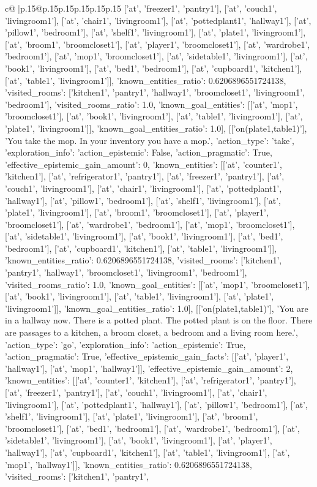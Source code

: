 \documentclass{article}
\begin{document}
{\begin{supertabular}{c@{$\;$}|p{.15\linewidth}@{}p{.15\linewidth}p{.15\linewidth}p{.15\linewidth}p{.15\linewidth}p{.15\linewidth}}
{{{['at', 'freezer1', 'pantry1'], ['at', 'couch1', 'livingroom1'], ['at', 'chair1', 'livingroom1'], ['at', 'pottedplant1', 'hallway1'], ['at', 'pillow1', 'bedroom1'], ['at', 'shelf1', 'livingroom1'], ['at', 'plate1', 'livingroom1'], ['at', 'broom1', 'broomcloset1'], ['at', 'player1', 'broomcloset1'], ['at', 'wardrobe1', 'bedroom1'], ['at', 'mop1', 'broomcloset1'], ['at', 'sidetable1', 'livingroom1'], ['at', 'book1', 'livingroom1'], ['at', 'bed1', 'bedroom1'], ['at', 'cupboard1', 'kitchen1'], ['at', 'table1', 'livingroom1']], 'known_entities_ratio': 0.6206896551724138, 'visited_rooms': ['kitchen1', 'pantry1', 'hallway1', 'broomcloset1', 'livingroom1', 'bedroom1'], 'visited_rooms_ratio': 1.0, 'known_goal_entities': [['at', 'mop1', 'broomcloset1'], ['at', 'book1', 'livingroom1'], ['at', 'table1', 'livingroom1'], ['at', 'plate1', 'livingroom1']], 'known_goal_entities_ratio': 1.0}}], [['on(plate1,table1)'], 'You take the mop. In your inventory you have a mop.', {'action_type': 'take', 'exploration_info': {'action_epistemic': False, 'action_pragmatic': True, 'effective_epistemic_gain_amount': 0, 'known_entities': [['at', 'counter1', 'kitchen1'], ['at', 'refrigerator1', 'pantry1'], ['at', 'freezer1', 'pantry1'], ['at', 'couch1', 'livingroom1'], ['at', 'chair1', 'livingroom1'], ['at', 'pottedplant1', 'hallway1'], ['at', 'pillow1', 'bedroom1'], ['at', 'shelf1', 'livingroom1'], ['at', 'plate1', 'livingroom1'], ['at', 'broom1', 'broomcloset1'], ['at', 'player1', 'broomcloset1'], ['at', 'wardrobe1', 'bedroom1'], ['at', 'mop1', 'broomcloset1'], ['at', 'sidetable1', 'livingroom1'], ['at', 'book1', 'livingroom1'], ['at', 'bed1', 'bedroom1'], ['at', 'cupboard1', 'kitchen1'], ['at', 'table1', 'livingroom1']], 'known_entities_ratio': 0.6206896551724138, 'visited_rooms': ['kitchen1', 'pantry1', 'hallway1', 'broomcloset1', 'livingroom1', 'bedroom1'], 'visited_rooms_ratio': 1.0, 'known_goal_entities': [['at', 'mop1', 'broomcloset1'], ['at', 'book1', 'livingroom1'], ['at', 'table1', 'livingroom1'], ['at', 'plate1', 'livingroom1']], 'known_goal_entities_ratio': 1.0}}], [['on(plate1,table1)'], 'You are in a hallway now. There is a potted plant. The potted plant is on the floor. There are passages to a kitchen, a broom closet, a bedroom and a living room here.', {'action_type': 'go', 'exploration_info': {'action_epistemic': True, 'action_pragmatic': True, 'effective_epistemic_gain_facts': [['at', 'player1', 'hallway1'], ['at', 'mop1', 'hallway1']], 'effective_epistemic_gain_amount': 2, 'known_entities': [['at', 'counter1', 'kitchen1'], ['at', 'refrigerator1', 'pantry1'], ['at', 'freezer1', 'pantry1'], ['at', 'couch1', 'livingroom1'], ['at', 'chair1', 'livingroom1'], ['at', 'pottedplant1', 'hallway1'], ['at', 'pillow1', 'bedroom1'], ['at', 'shelf1', 'livingroom1'], ['at', 'plate1', 'livingroom1'], ['at', 'broom1', 'broomcloset1'], ['at', 'bed1', 'bedroom1'], ['at', 'wardrobe1', 'bedroom1'], ['at', 'sidetable1', 'livingroom1'], ['at', 'book1', 'livingroom1'], ['at', 'player1', 'hallway1'], ['at', 'cupboard1', 'kitchen1'], ['at', 'table1', 'livingroom1'], ['at', 'mop1', 'hallway1']], 'known_entities_ratio': 0.6206896551724138, 'visited_rooms': ['kitchen1', 'pantry1', }}}
\end{supertabular}}
\end{document}
